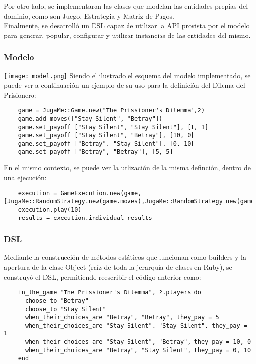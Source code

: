 \documentclass[10pt]{article}
\numberwithin{equation}{section}
\numberwithin{figure}{section}
\numberwithin{table}{section}
\begin{document}
Por otro lado, se implementaron las clases que modelan las entidades propias del dominio, como son Juego, Estrategia y Matriz de Pagos.\\

Finalmente, se desarrolló un DSL capaz de utilizar la API provista por el modelo para generar, popular, configurar y utilizar instancias de las entidades del mismo.

\subsubsection{Modelo}
\texttt{[image: model.png]}
Siendo el ilustrado el esquema del modelo implementado, se puede ver a continuación un ejemplo de su uso para la definición del Dilema del Prisionero:
\begin{lstlisting}
    game = JugaMe::Game.new("The Prissioner's Dilemma",2)
    game.add_moves(["Stay Silent", "Betray"])
    game.set_payoff ["Stay Silent", "Stay Silent"], [1, 1]
    game.set_payoff ["Stay Silent", "Betray"], [10, 0]
    game.set_payoff ["Betray", "Stay Silent"], [0, 10]
    game.set_payoff ["Betray", "Betray"], [5, 5]
\end{lstlisting}
En el mismo contexto, se puede ver la utlización de la misma definción, dentro de una ejecución:
\begin{lstlisting}
    execution = GameExecution.new(game, [JugaMe::RandomStrategy.new(game.moves),JugaMe::RandomStrategy.new(game.moves)])
    execution.play(10)
    results = execution.individual_results
\end{lstlisting}

\subsubsection{DSL}
Mediante la construcción de métodos estáticos que funcionan como builders y la apertura de la clase Object (raíz de toda la jerarquía de clases en Ruby), se construyó el DSL, permitiendo reescribir el código anterior como:\\

\begin{lstlisting}
    in_the_game "The Prissioner's Dilemma", 2.players do
      choose_to "Betray"
      choose_to "Stay Silent"
      when_their_choices_are "Betray", "Betray", they_pay = 5
      when_their_choices_are "Stay Silent", "Stay Silent", they_pay = 1
      when_their_choices_are "Stay Silent", "Betray", they_pay = 10, 0
      when_their_choices_are "Betray", "Stay Silent", they_pay = 0, 10
    end
\end{lstlisting}
\end{document}
